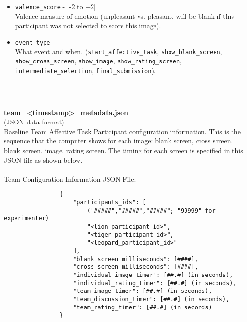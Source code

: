 \begin{description}
\begin{addmargin}[0em]{0em}
\begin{addmargin}[1em]{0em}
\begin{itemize}
                \item \verb|valence_score| - [-2 to +2]\\Valence measure of emotion (unpleasant vs. pleasant, will be blank if this participant was not selected to score this image).
                \item \verb|event_type| -\\What event and when.
                    (\verb|start_affective_task|, \verb|show_blank_screen|,
                    \verb|show_cross_screen|, \verb|show_image|, \verb|show_rating_screen|,
                    \verb|intermediate_selection|, \verb|final_submission|).
            \end{itemize}
        \end{addmargin} %


        \textbf{\\\\}
        \begin{addmargin}[1em]{0em} %
            \textbf{team\_<timestamp>\_metadata.json}\\(JSON data format)\\
            Baseline Team Affective Task Participant configuration information.
            This is the sequence that the computer shows for each image: blank screen, cross screen, blank screen, image, rating screen.
            The timing for each screen is specified in this JSON file as shown below.\\\\
            Team Configuration Information JSON File:
            \begin{verbatim}
                {
                    "participants_ids": [
                        ("#####","#####","#####"; "99999" for experimenter)
                        "<lion_participant_id>",
                        "<tiger_participant_id>",
                        "<leopard_participant_id>"
                    ],
                    "blank_screen_milliseconds": [####],
                    "cross_screen_milliseconds": [####],
                    "individual_image_timer": [##.#] (in seconds),
                    "individual_rating_timer": [##.#] (in seconds),
                    "team_image_timer": [##.#] (in seconds),
                    "team_discussion_timer": [##.#] (in seconds),
                    "team_rating_timer": [##.#] (in seconds)
                }
            \end{verbatim}
        \end{addmargin} %


\end{addmargin}
\end{description}
